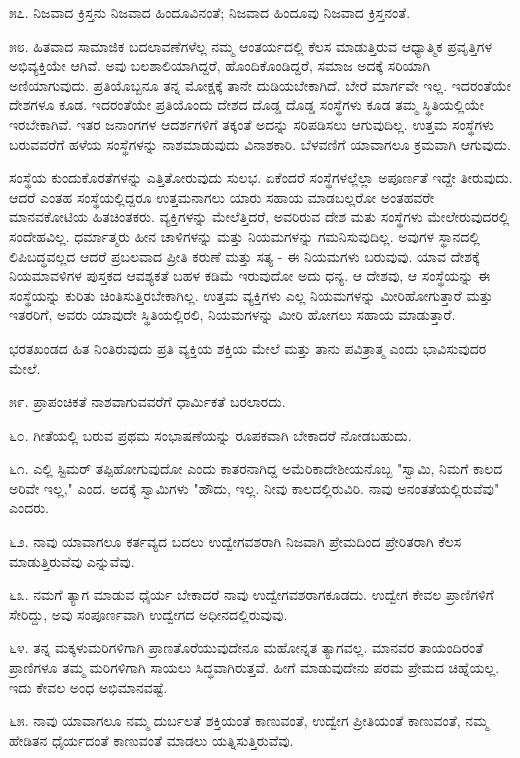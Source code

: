 ೫೭. ನಿಜವಾದ ಕ್ರಿಸ್ತನು ನಿಜವಾದ ಹಿಂದೂವಿನಂತೆ; ನಿಜವಾದ ಹಿಂದೂವು ನಿಜವಾದ ಕ್ರಿಸ್ತನಂತೆ.

೫೮. ಹಿತವಾದ ಸಾಮಾಜಿಕ ಬದಲಾವಣೆಗಳೆಲ್ಲ ನಮ್ಮ ಆಂತರ್ಯದಲ್ಲಿ ಕೆಲಸ ಮಾಡುತ್ತಿರುವ ಆಧ್ಯಾತ್ಮಿಕ ಪ್ರವೃತ್ತಿಗಳ ಅಭಿವ್ಯಕ್ತಿಯೇ ಆಗಿವೆ. ಅವು ಬಲಶಾಲಿಯಾಗಿದ್ದರೆ, ಹೊಂದಿಕೊಂಡಿದ್ದರೆ, ಸಮಾಜ ಅದಕ್ಕೆ ಸರಿಯಾಗಿ ಅಣಿಯಾಗುವುದು. ಪ್ರತಿಯೊಬ್ಬನೂ ತನ್ನ ಮೋಕ್ಷಕ್ಕೆ ತಾನೇ ದುಡಿಯಬೇಕಾಗಿದೆ. ಬೇರೆ ಮಾರ್ಗವೇ ಇಲ್ಲ. ಇದರಂತೆಯೇ ದೇಶಗಳೂ ಕೂಡ. ಇದರಂತೆಯೇ ಪ್ರತಿಯೊಂದು ದೇಶದ ದೊಡ್ಡ ದೊಡ್ಡ ಸಂಸ್ಥೆಗಳು ಕೂಡ ತಮ್ಮ ಸ್ಥಿತಿಯಲ್ಲಿಯೇ ಇರಬೇಕಾಗಿವೆ. ಇತರ ಜನಾಂಗಗಳ ಆದರ್ಶಗಳಿಗೆ ತಕ್ಕಂತೆ ಅದನ್ನು ಸರಿಪಡಿಸಲು ಆಗುವುದಿಲ್ಲ. ಉತ್ತಮ ಸಂಸ್ಥೆಗಳು ಬರುವವರೆಗೆ ಹಳೆಯ ಸಂಸ್ಥೆಗಳನ್ನು ನಾಶಮಾಡುವುದು ವಿನಾಶಕಾರಿ. ಬೆಳವಣಿಗೆ ಯಾವಾಗಲೂ ಕ್ರಮವಾಗಿ ಆಗುವುದು.

ಸಂಸ್ಥೆಯ ಕುಂದುಕೊರತೆಗಳನ್ನು ಎತ್ತಿತೋರುವುದು ಸುಲಭ. ಏಕೆಂದರೆ ಸಂಸ್ಥೆಗಳಲ್ಲೆಲ್ಲಾ ಅಪೂರ್ಣತೆ ಇದ್ದೇ ತೀರುವುದು. ಆದರೆ ಎಂತಹ ಸಂಸ್ಥೆಯಲ್ಲಿದ್ದರೂ ಉತ್ತಮನಾಗಲು ಯಾರು ಸಹಾಯ ಮಾಡಬಲ್ಲರೋ ಅಂತಹವರೇ ಮಾನವಕೋಟಿಯ ಹಿತಚಿಂತಕರು. ವ್ಯಕ್ತಿಗಳನ್ನು ಮೇಲೆತ್ತಿದರೆ, ಅವರಿರುವ ದೇಶ ಮತು ಸಂಸ್ಥೆಗಳು ಮೇಲೇರುವುದರಲ್ಲಿ ಸಂದೇಹವಿಲ್ಲ. ಧರ್ಮಾತ್ಮರು ಹೀನ ಚಾಳಿಗಳನ್ನು ಮತ್ತು ನಿಯಮಗಳನ್ನು ಗಮನಿಸುವುದಿಲ್ಲ. ಅವುಗಳ ಸ್ಥಾನದಲ್ಲಿ ಲಿಪಿಬದ್ಧವಲ್ಲದ ಆದರೆ ಪ್ರಬಲವಾದ ಪ್ರೀತಿ ಕರುಣೆ ಮತ್ತು ಸತ್ಯ - ಈ ನಿಯಮಗಳು ಬರುವುವು. ಯಾವ ದೇಶಕ್ಕೆ ನಿಯಮಾವಳಿಗಳ ಪುಸ್ತಕದ ಆವಶ್ಯಕತೆ ಬಹಳ ಕಡಿಮೆ ಇರುವುದೋ ಅದು ಧನ್ಯ. ಆ ದೇಶವು, ಆ ಸಂಸ್ಥೆಯನ್ನು ಈ ಸಂಸ್ಥೆಯನ್ನು ಕುರಿತು ಚಿಂತಿಸುತ್ತಿರಬೇಕಾಗಿಲ್ಲ. ಉತ್ತಮ ವ್ಯಕ್ತಿಗಳು ಎಲ್ಲ ನಿಯಮಗಳನ್ನು ಮೀರಿಹೋಗುತ್ತಾರೆ ಮತ್ತು ಇತರರಿಗೆ, ಅವರು ಯಾವುದೇ ಸ್ಥಿತಿಯಲ್ಲಿರಲಿ, ನಿಯಮಗಳನ್ನು ಮೀರಿ ಹೋಗಲು ಸಹಾಯ ಮಾಡುತ್ತಾರೆ.

ಭರತಖಂಡದ ಹಿತ ನಿಂತಿರುವುದು ಪ್ರತಿ ವ್ಯಕ್ತಿಯ ಶಕ್ತಿಯ ಮೇಲೆ ಮತ್ತು ತಾನು ಪವಿತ್ರಾತ್ಮ ಎಂದು ಭಾವಿಸುವುದರ ಮೇಲೆ.

೫೯. ಪ್ರಾಪಂಚಿಕತೆ ನಾಶವಾಗುವವರೆಗೆ ಧಾರ್ಮಿಕತೆ ಬರಲಾರದು.

೬೦. ಗೀತೆಯಲ್ಲಿ ಬರುವ ಪ್ರಥಮ ಸಂಭಾಷಣೆಯನ್ನು ರೂಪಕವಾಗಿ ಬೇಕಾದರೆ ನೋಡಬಹುದು.

೬೧. ಎಲ್ಲಿ ಸ್ಟಿಮರ್ ತಪ್ಪಿಹೋಗುವುದೋ ಎಂದು ಕಾತರನಾಗಿದ್ದ ಅಮೆರಿಕಾದೇಶೀಯನೊಬ್ಬ "ಸ್ವಾಮಿ, ನಿಮಗೆ ಕಾಲದ ಅರಿವೇ ಇಲ್ಲ," ಎಂದ. ಅದಕ್ಕೆ ಸ್ವಾಮಿಗಳು "ಹೌದು, ಇಲ್ಲ. ನೀವು ಕಾಲದಲ್ಲಿರುವಿರಿ. ನಾವು ಅನಂತತೆಯಲ್ಲಿರುವೆವು" ಎಂದರು.

೬೨. ನಾವು ಯಾವಾಗಲೂ ಕರ್ತವ್ಯದ ಬದಲು ಉದ್ವೇಗವಶರಾಗಿ ನಿಜವಾಗಿ ಪ್ರೇಮದಿಂದ ಪ್ರೇರಿತರಾಗಿ ಕೆಲಸ ಮಾಡುತ್ತಿರುವೆವು ಎನ್ನುವೆವು.

೬೩. ನಮಗೆ ತ್ಯಾಗ ಮಾಡುವ ಧೈರ್ಯ ಬೇಕಾದರೆ ನಾವು ಉದ್ವೇಗವಶರಾಗಕೂಡದು. ಉದ್ವೇಗ ಕೇವಲ ಪ್ರಾಣಿಗಳಿಗೆ ಸೇರಿದ್ದು, ಅವು ಸಂಪೂರ್ಣವಾಗಿ ಉದ್ವೇಗದ ಅಧೀನದಲ್ಲಿರುವುವು.

೬೪. ತನ್ನ ಮಕ್ಕಳುಮರಿಗಳಿಗಾಗಿ ಪ್ರಾಣತೊರೆಯುವುದೇನೂ ಮಹೋನ್ನತ ತ್ಯಾಗವಲ್ಲ. ಮಾನವರ ತಾಯಂದಿರಂತೆ ಪ್ರಾಣಿಗಳೂ ತಮ್ಮ ಮರಿಗಳಿಗಾಗಿ ಸಾಯಲು ಸಿದ್ಧವಾಗಿರುತ್ತವೆ. ಹೀಗೆ ಮಾಡುವುದೇನು ಪರಮ ಪ್ರೇಮದ ಚಿಹ್ನೆಯಲ್ಲ. ಇದು ಕೇವಲ ಅಂಧ ಅಭಿಮಾನವಷ್ಟೆ.

೬೫. ನಾವು ಯಾವಾಗಲೂ ನಮ್ಮ ದುರ್ಬಲತೆ ಶಕ್ತಿಯಂತೆ ಕಾಣುವಂತೆ, ಉದ್ವೇಗ ಪ್ರೀತಿಯಂತೆ ಕಾಣುವಂತೆ, ನಮ್ಮ ಹೇಡಿತನ ಧೈರ್ಯದಂತೆ ಕಾಣುವಂತೆ ಮಾಡಲು ಯತ್ನಿಸುತ್ತಿರುವೆವು.

